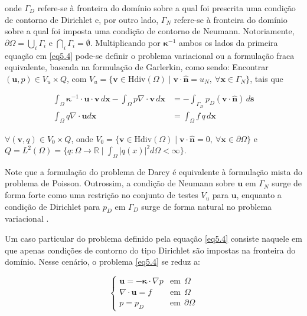 onde $\Gamma_{D}$ refere-se à fronteira do domínio sobre a qual foi prescrita uma condição de contorno de Dirichlet e, por outro lado, $\Gamma_{N}$ refere-se à fronteira do domínio sobre a qual foi imposta uma condição de contorno de Neumann. Notoriamente, $\partial \Omega = \bigcup_{i} \Gamma_{i}$ e $\bigcap_{i} \Gamma_{i} = \emptyset$. Multiplicando por $\boldsymbol{\kappa}^{-1}$ ambos os lados da primeira equação em \ref{eq5.4} pode-se definir o problema variacional ou a formulação fraca equivalente, baseada na formulação de Garlerkin, como sendo: Encontrar $(\mathbf{u}, p) \in V_{u} \times Q$, com $V_{u} = \{ \mathbf{v} \in \text{Hdiv}(\Omega) \mid \mathbf{v} \cdot \mathbf{\hat{n}} = u_{N}, \ \forall \mathbf{x} \in \Gamma_{N}\}$, tais que

\begin{equation}
	\begin{aligned}
		\int_{\Omega}\boldsymbol{\kappa}^{-1} \cdot \mathbf{u} \cdot \mathbf{v} \, d\mathbf{x}  - \int_{\Omega}p\nabla \cdot \mathbf{v} \, d\mathbf{x} &= -\int_{\Gamma_{D}}p_D \left (\mathbf{v} \cdot \hat{\mathbf{n}}\right ) \, d\mathbf{s} \\
		\int_{\Omega} q \nabla \cdot \mathbf{u} d\mathbf{x} &= \int_{\Omega} f \, q \,d\mathbf{x}
	\end{aligned}
\end{equation}

$\forall (\mathbf{v},q) \in V_0 \times Q$, onde $V_{0} = \{ \mathbf{v} \in \text{Hdiv}(\Omega)  \mid \mathbf{v} \cdot \mathbf{\hat{n}} = 0, \ \forall \mathbf{x} \in \partial \Omega\}$ e $Q = L^{2}(\Omega) = \{q:\Omega \rightarrow\mathbb{R} \mid \int_{\Omega} |q(x)|^{2} d\Omega < \infty\}$.

Note que a formulação do problema de Darcy é equivalente à formulação mista do problema de Poisson. Outrossim, a condição de Neumann sobre $\mathbf{u}$ em $\Gamma_N$ surge de forma forte como uma restrição no conjunto de testes $V_{u}$ para $\mathbf{u}$, enquanto a condição de Dirichlet para $p_D$ em $\Gamma_D$ surge de forma natural no problema variacional \cite{Ausas2022}.

Um caso particular do problema definido pela equação \ref{eq5.4} consiste naquele em que apenas condições de contorno do tipo Dirichlet são impostas na fronteira do domínio. Nesse cenário, o problema \ref{eq5.4} se reduz a:

\begin{equation}\label{eq5.6}
	\begin{cases}
		\mathbf{u}= -\boldsymbol{\kappa} \cdot \nabla{p} & \text{em}~~\Omega \\
		\nabla \cdot \mathbf{u} = f & \text{em}~~\Omega \\
		p = p_D & \text{em}~~\partial \Omega
	\end{cases}
\end{equation}

